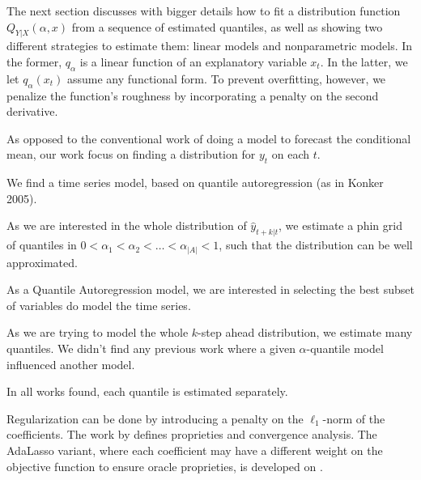 The next section discusses with bigger details how to fit a distribution function $Q_{Y|X}(\alpha,x)$ from a sequence of estimated quantiles, as well as showing two different strategies to estimate them: linear models and nonparametric models. In the former, $q_\alpha$ is a linear function of an explanatory variable $x_t$.
In the latter, we let $q_\alpha(x_t)$ assume any functional form. To prevent overfitting, however, we penalize the function's roughness by incorporating a penalty on the second derivative.



As opposed to the conventional work of doing a model to forecast the
conditional mean, our work focus on finding a distribution for $y_{t}$
on each $t$. 

We find a time series model, based on quantile autoregression (as
in Konker 2005).

As we are interested in the whole distribution of $\hat{y}_{t+k|t}$,
we estimate a phin grid of quantiles in $0<\alpha_{1}<\alpha_{2}<\dots<\alpha_{|A|}<1$,
such that the distribution can be well approximated.

As a Quantile Autoregression model, we are interested in selecting
the best subset of variables do model the time series. 

As we are trying to model the whole $k$-step ahead distribution,
we estimate many quantiles. We didn't find any previous work where
a given $\alpha$-quantile model influenced another model.

In all works found, each quantile is estimated separately. 

Regularization can be done by introducing a penalty on the $\ell_1$-norm of the coefficients. The work by \cite{belloni_l1-penalized_2009} defines proprieties and convergence analysis. The AdaLasso variant, where each coefficient may have a different weight on the objective function to ensure oracle proprieties, is developed on \cite{ciuperca_adaptive_2016}.
